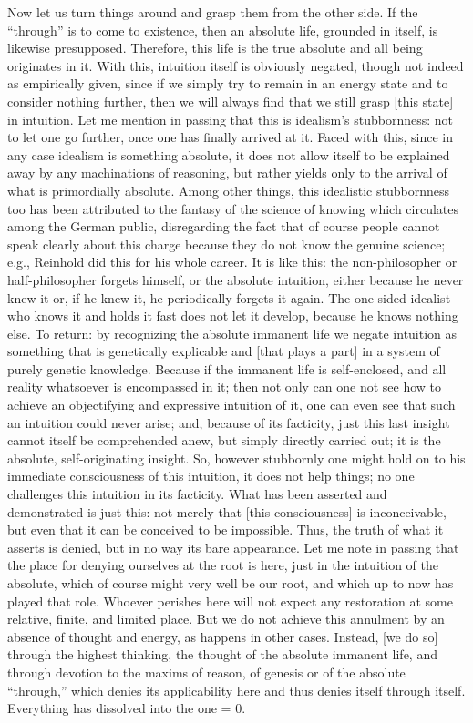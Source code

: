 Now let us turn things around
and grasp them from the other side.
If the “through” is to come to existence,
then an absolute life, grounded in itself,
is likewise presupposed.
Therefore, this life is the true absolute
and all being originates in it.
With this, intuition itself is obviously negated,
though not indeed as empirically given,
since if we simply try to remain in an energy state
and to consider nothing further,
then we will always find that we still grasp
[this state] in intuition.
Let me mention in passing that
this is idealism’s stubbornness:
not to let one go further,
once one has finally arrived at it.
Faced with this, since in any case
idealism is something absolute,
it does not allow itself to be explained away
by any machinations of reasoning,
but rather yields only to the arrival
of what is primordially absolute.
Among other things, this idealistic stubbornness too has been
attributed to the fantasy of the science of knowing
which circulates among the German public,
disregarding the fact that of course
people cannot speak clearly about this charge
because they do not know the genuine science;
e.g., Reinhold did this for his whole career.
It is like this:
the non-philosopher or half-philosopher forgets himself,
or the absolute intuition, either because he never knew it
or, if he knew it, he periodically forgets it again.
The one-sided idealist who knows it and holds it fast
does not let it develop, because he knows nothing else.
To return:
by recognizing the absolute immanent life
we negate intuition as something that is genetically explicable
and [that plays a part] in a system of purely genetic knowledge.
Because if the immanent life is self-enclosed,
and all reality whatsoever is encompassed in it;
then not only can one not see how to achieve
an objectifying and expressive intuition of it,
one can even see that such an intuition could never arise;
and, because of its facticity, just this last insight
cannot itself be comprehended anew,
but simply directly carried out;
it is the absolute, self-originating insight.
So, however stubbornly one might hold on
to his immediate consciousness of this intuition,
it does not help things;
no one challenges this intuition in its facticity.
What has been asserted and demonstrated is just this:
not merely that [this consciousness] is inconceivable,
but even that it can be conceived to be impossible.
Thus, the truth of what it asserts is denied,
but in no way its bare appearance.
Let me note in passing that the place
for denying ourselves at the root is here,
just in the intuition of the absolute,
which of course might very well be our root,
and which up to now has played that role.
Whoever perishes here will not expect
any restoration at some relative, finite, and limited place.
But we do not achieve this annulment
by an absence of thought and energy,
as happens in other cases.
Instead, [we do so] through the highest thinking,
the thought of the absolute immanent life,
and through devotion to the maxims of reason,
of genesis or of the absolute “through,”
which denies its applicability here
and thus denies itself through itself.
Everything has dissolved into the one = 0.

